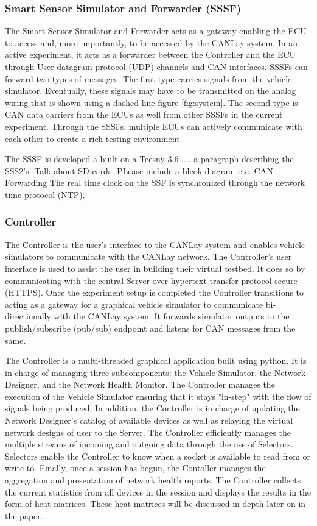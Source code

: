 \documentclass[letterpaper,twocolumn,10pt]{article}
\begin{document}
\subsubsection{Smart Sensor Simulator and Forwarder (SSSF)}
The Smart Sensor Simulator and Forwarder acts as a gateway enabling the ECU to access and, more importantly, to be accessed by the CANLay system. In an active experiment, it acts as a forwarder between the Controller and the ECU through User datagram protocol (UDP) channels and CAN interfaces. SSSFs can forward two types of messages. 
The first type carries signals from the vehicle simulator. Eventually, these signals may have to be transmitted on the analog wiring that is shown using a dashed line figure \ref{fig:system}.  
The second type is CAN data carriers from the ECUs as well from other SSSFs in the current experiment. Through the SSSFs, multiple ECUs can actively communicate with each other to create a rich testing environment.

The SSSF is developed a built on a Teesny 3.6 .... a paragraph describing the SSS2's. Talk about SD cards. PLease include a blcok diagram etc.
CAN Forwarding 
The real time clock on the SSF is synchronized through the network time protocol (NTP).

\subsubsection{Controller}
The Controller is the user's interface to the CANLay system and enables vehicle simulators to communicate with the CANLay network. The Controller’s user interface is used to assist the user in building their virtual testbed. 
It does so by communicating with the central Server over hypertext transfer protocol secure (HTTPS). 
Once the experiment setup is completed the Controller transitions to acting as a gateway for a graphical vehicle simulator to communicate bi-directionally with the CANLay system. It forwards simulator outputs to the publish/subscribe (pub/sub) endpoint and listens for CAN messages from the same.

The Controller is a multi-threaded graphical application built using python. It is in charge of managing three subcomponents: the Vehicle Simulator, the Network Designer, and the Network Health Monitor. The Controller manages the execution of the Vehicle Simulator ensuring that it stays "in-step" with the flow of signals being produced. In addition, the Controller is in charge of updating the Network Designer's catalog of available devices as well as relaying the virtual network designs of user to the Server. The Controller efficiently manages the multiple streams of incoming and outgoing data through the use of Selectors. Selectors enable the Controller to know when a socket is available to read from or write to. Finally, once a session has begun, the Contoller manages the aggregation and presentation of network health reports. The Controller collects the current statistics from all devices in the session and displays the results in the form of heat matrices. These heat matrices will be discussed in-depth later on in the paper.
\end{document}
